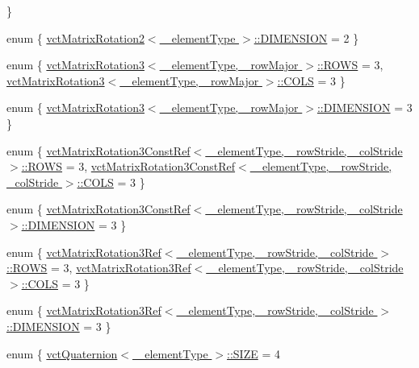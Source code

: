 \begin{DoxyCompactItemize}
 \}
\item 
enum \{ \hyperlink{group__cisst_vector_ggadb5878f342cf4be98c9e6d79e9ae359ba3641e8aa72f502ddb4dc582365767927}{vct\+Matrix\+Rotation2$<$ \+\_\+element\+Type $>$\+::\+D\+I\+M\+E\+N\+S\+I\+O\+N} = 2
 \}
\item 
enum \{ \hyperlink{group__cisst_vector_ggac08ca99a9ddb4e59a896f765b4ae95bfa2e2c8802539f04eff93b4598b1fbb362}{vct\+Matrix\+Rotation3$<$ \+\_\+element\+Type, \+\_\+row\+Major $>$\+::\+R\+O\+W\+S} = 3, 
\hyperlink{group__cisst_vector_ggac08ca99a9ddb4e59a896f765b4ae95bfa8c935a63b595f6c48177e1213c36f787}{vct\+Matrix\+Rotation3$<$ \+\_\+element\+Type, \+\_\+row\+Major $>$\+::\+C\+O\+L\+S} = 3
 \}
\item 
enum \{ \hyperlink{group__cisst_vector_ggaa21ad8fcafb1ab9d70efcec9bda6eab2af25ebbcafe4db62f894c21db0608cd65}{vct\+Matrix\+Rotation3$<$ \+\_\+element\+Type, \+\_\+row\+Major $>$\+::\+D\+I\+M\+E\+N\+S\+I\+O\+N} = 3
 \}
\item 
enum \{ \hyperlink{group__cisst_vector_ggab3f61204b713365df89d134aecf5f257a2dfbffc885c6c6a8058f693056581cad}{vct\+Matrix\+Rotation3\+Const\+Ref$<$ \+\_\+element\+Type, \+\_\+row\+Stride, \+\_\+col\+Stride $>$\+::\+R\+O\+W\+S} = 3, 
\hyperlink{group__cisst_vector_ggab3f61204b713365df89d134aecf5f257a6703147fc82b54abf5f259f447b078da}{vct\+Matrix\+Rotation3\+Const\+Ref$<$ \+\_\+element\+Type, \+\_\+row\+Stride, \+\_\+col\+Stride $>$\+::\+C\+O\+L\+S} = 3
 \}
\item 
enum \{ \hyperlink{group__cisst_vector_ggaa4e695dfd4ce5d7c16cef20759dd2a38a35d674f5d98f31d082dddd79c874ba25}{vct\+Matrix\+Rotation3\+Const\+Ref$<$ \+\_\+element\+Type, \+\_\+row\+Stride, \+\_\+col\+Stride $>$\+::\+D\+I\+M\+E\+N\+S\+I\+O\+N} = 3
 \}
\item 
enum \{ \hyperlink{group__cisst_vector_ggad8b09a8996d8d39c1a4e6d1d1143d5d5a11813f4600989202aee03ee7754ab0d1}{vct\+Matrix\+Rotation3\+Ref$<$ \+\_\+element\+Type, \+\_\+row\+Stride, \+\_\+col\+Stride $>$\+::\+R\+O\+W\+S} = 3, 
\hyperlink{group__cisst_vector_ggad8b09a8996d8d39c1a4e6d1d1143d5d5a0fcc4856678937e7ae2094a9d06b05e5}{vct\+Matrix\+Rotation3\+Ref$<$ \+\_\+element\+Type, \+\_\+row\+Stride, \+\_\+col\+Stride $>$\+::\+C\+O\+L\+S} = 3
 \}
\item 
enum \{ \hyperlink{group__cisst_vector_gga0eeec6fc7124d73c9d025d98c3f17b9fab44a8c65e2884fa5d2b3c6a92aa23b2e}{vct\+Matrix\+Rotation3\+Ref$<$ \+\_\+element\+Type, \+\_\+row\+Stride, \+\_\+col\+Stride $>$\+::\+D\+I\+M\+E\+N\+S\+I\+O\+N} = 3
 \}
\item 
enum \{ \hyperlink{group__cisst_vector_ggafa19be877555ceeedba0f4e910b22e51a12aabd231905465cec7ef73c8b4c043f}{vct\+Quaternion$<$ \+\_\+element\+Type $>$\+::\+S\+I\+Z\+E} = 4

\end{DoxyCompactItemize}
